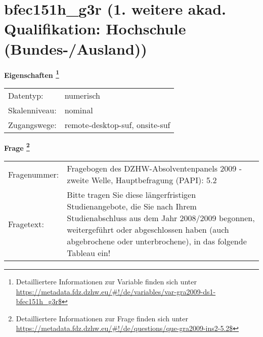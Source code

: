 
    \setcounter{footnote}{0}

    \vspace*{-1.8cm}
	\section{bfec151h\_g3r (1. weitere akad. Qualifikation: Hochschule (Bundes-/Ausland))}
	\label{section:bfec151h_g3r}



    \vspace*{0.5cm}
    \noindent\textbf{Eigenschaften
	\footnote{Detailliertere Informationen zur Variable finden sich unter
		\url{https://metadata.fdz.dzhw.eu/\#!/de/variables/var-gra2009-ds1-bfec151h_g3r$}}}\\
	\begin{tabularx}{\hsize}{@{}lX}
	Datentyp: & numerisch \\
	Skalenniveau: & nominal \\
	Zugangswege: &
	  remote-desktop-suf, 
	  onsite-suf
 \\
    \end{tabularx}



				\vspace*{0.5cm}
                \noindent\textbf{Frage
	                \footnote{Detailliertere Informationen zur Frage finden sich unter
		              \url{https://metadata.fdz.dzhw.eu/\#!/de/questions/que-gra2009-ins2-5.2$}}}\\
				\begin{tabularx}{\hsize}{@{}lX}
					Fragenummer: &
					  Fragebogen des DZHW-Absolventenpanels 2009 - zweite Welle, Hauptbefragung (PAPI):
					  5.2
 \\
					Fragetext: & Bitte tragen Sie diese längerfristigen Studienangebote, die Sie nach Ihrem Studienabschluss aus dem Jahr 2008/2009 begonnen, weitergeführt oder abgeschlossen haben (auch abgebrochene oder unterbrochene), in das folgende Tableau ein! \\
				\end{tabularx}






